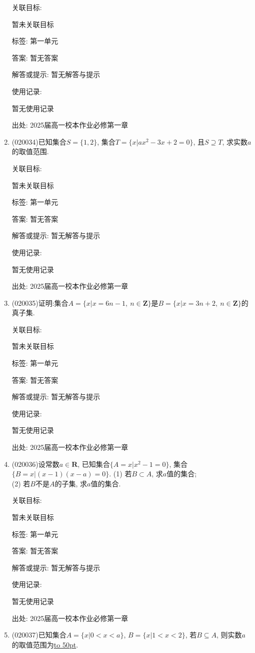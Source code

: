 \documentclass[10pt,a4paper]{article}
\newcommand{\blank}[1]{\underline{\hbox to #1pt{}}}
\begin{document}
\begin{enumerate}[1.]
关联目标:

暂未关联目标



标签: 第一单元

答案: 暂无答案

解答或提示: 暂无解答与提示

使用记录:

暂无使用记录


出处: 2025届高一校本作业必修第一章
\item { (020034)}已知集合$S=\{1, 2\}$, 集合$T=\{x|ax^2-3x+2=0\}$, 且$S\supseteq T$, 求实数$a$的取值范围.


关联目标:

暂未关联目标



标签: 第一单元

答案: 暂无答案

解答或提示: 暂无解答与提示

使用记录:

暂无使用记录


出处: 2025届高一校本作业必修第一章
\item { (020035)}证明:集合$A=\{x|x=6n-1, \ n\in\mathbf{Z}\}$是$B=\{x|x=3n+2, \ n\in\mathbf{Z}\}$的真子集.


关联目标:

暂未关联目标



标签: 第一单元

答案: 暂无答案

解答或提示: 暂无解答与提示

使用记录:

暂无使用记录


出处: 2025届高一校本作业必修第一章
\item { (020036)}设常数$a\in \mathbf{R}$, 已知集合$\{A=x|x^2-1=0\}$, 集合$\{B=x|(x-1)(x-a)=0\}$.
(1) 若$B\subset A$, 求$a$值的集合;\\
(2) 若$B$不是$A$的子集, 求$a$值的集合.


关联目标:

暂未关联目标



标签: 第一单元

答案: 暂无答案

解答或提示: 暂无解答与提示

使用记录:

暂无使用记录


出处: 2025届高一校本作业必修第一章
\item { (020037)}已知集合$A=\{x|0<x<a\}$, $B=\{x|1<x<2\}$, 若$B\subseteq A$, 则实数$a$的取值范围为\blank{50}.



\end{enumerate}
\end{document}
